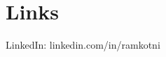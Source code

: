 \documentclass[letterpaper]{deedy-resume} %
\begin{document}
\begin{minipage}[t]{0.33\textwidth}
\sectionspace %

\section{Links} 

LinkedIn: linkedin.com/in/ramkotni \\


\sectionspace %


\end{minipage} %
\hfill
%
%
\end{document}
